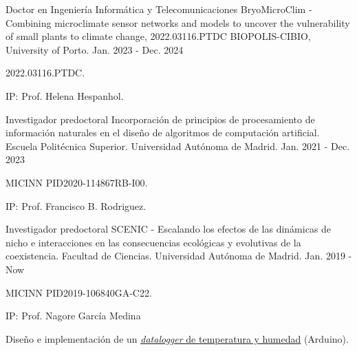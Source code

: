 
\begin{cventries}


  \cventry
    {Doctor en Ingeniería Informática y Telecomunicaciones} %
    {BryoMicroClim - Combining microclimate sensor networks and models to uncover the
vulnerability of small plants to climate change, 2022.03116.PTDC} %
    {BIOPOLIS-CIBIO, University of Porto.} %
    {Jan. 2023 - Dec. 2024} %
    {
      \begin{cvitems} %
        \item {2022.03116.PTDC.}
        \item {IP: Prof. Helena Hespanhol.}
      \end{cvitems}
    }

  \cventry
    {Investigador predoctoral} %
    {Incorporación de principios de procesamiento de información naturales en el diseño de algoritmos de computación artificial.} %
    {Escuela Politécnica Superior. Universidad Autónoma de Madrid.} %
    {Jan. 2021 - Dec. 2023} %
    {
      \begin{cvitems} %
        \item {MICINN PID2020-114867RB-I00.}
        \item {IP: Prof. Francisco B. Rodriguez.}
      \end{cvitems}
    }

  \cventry
    {Investigador predoctoral} %
    {SCENIC - Escalando los efectos de las dinámicas de nicho e interacciones en las consecuencias ecológicas y evolutivas de la coexistencia.} %
    {Facultad de Ciencias. Universidad Autónoma de Madrid.} %
    {Jan. 2019 - Now} %
    {
      \begin{cvitems} %
        \item {MICINN PID2019-106840GA-C22.}
        \item {IP: Prof. Nagore García Medina}
        \item {Diseño e implementación de un \underline{\href{https://github.com/united-ecology/btmboard}{\textit{datalogger} de temperatura y humedad}} (Arduino).}
      \end{cvitems}
    }


\end{cventries}
